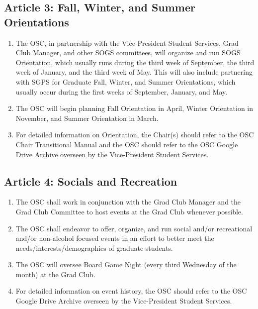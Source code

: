 \subsection{Article 3: Fall, Winter, and Summer Orientations}
\begin{enumerate}[label*=\arabic*., align=left]	
\item The OSC, in partnership with the Vice-President Student Services, Grad Club Manager, and other SOGS
committees, will organize and run SOGS Orientation, which usually runs during the third week of September, the third week of January, and the third week of May. This will also include partnering with SGPS for Graduate Fall, Winter, and Summer Orientations, which usually occur during the first weeks of September, January, and May.
\item The OSC will begin planning Fall Orientation in April, Winter Orientation in November, and Summer Orientation in March.
\item For detailed information on Orientation, the Chair(s) should refer to the OSC Chair Transitional Manual and the OSC should refer to the OSC Google Drive Archive overseen by the Vice-President Student Services.
\end{enumerate}

\subsection{Article 4: Socials and Recreation}
\begin{enumerate}[label*=\arabic*., align=left]	
\item The OSC shall work in conjunction with the Grad Club Manager and the Grad Club Committee to host
events at the Grad Club whenever possible.
\item The OSC shall endeavor to offer, organize, and run social and/or recreational and/or non-alcohol focused
events in an effort to better meet the needs/interests/demographics of graduate students.
\item The OSC will oversee Board Game Night (every third Wednesday of the month) at the Grad Club.
\item For detailed information on event history, the OSC should refer to the OSC Google Drive Archive overseen
by the Vice-President Student Services.
\end{enumerate}

